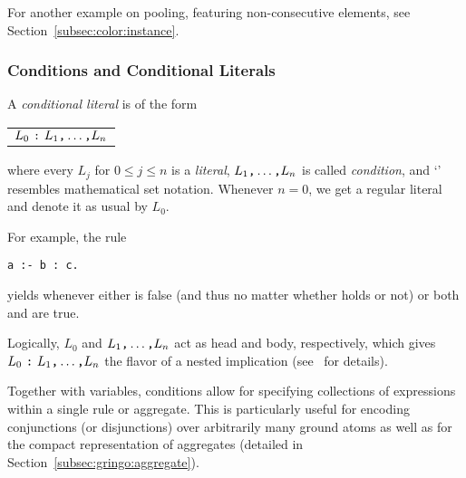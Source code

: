 For another example on pooling, featuring non-consecutive elements, see Section~\ref{subsec:color:instance}.

\subsubsection{Conditions and Conditional Literals}\label{subsec:gringo:condition}
%
%
A \emph{conditional literal} is of the form
\par
\medskip
\begin{tabular}{l}
$L_0~\texttt{:}~L_1\text{\texttt{,}}\dots\text{\texttt{,}}L_n$ %
\end{tabular}
\par
\medskip
\noindent
%
where every $L_j$ for $0\leq j\leq n$ is a \emph{literal},
$L_1\text{\texttt{,}}\dots\text{\texttt{,}}L_n$ is called \textit{condition},
and `\code{:}' resembles mathematical set notation.
Whenever $n=0$, we get a regular literal and denote it as usual by $L_0$.

For example, the rule
\begin{lstlisting}[numbers=none]
a :- b : c.
\end{lstlisting}
yields  whenever either  is false (and thus no matter whether  holds or not) or both  and  are true.

\begin{note}
Logically, $L_0$ and $L_1\text{\texttt{,}}\dots\text{\texttt{,}}L_n$ act as
head and body, respectively,
which gives $L_0~\texttt{:}~L_1\text{\texttt{,}}\dots\text{\texttt{,}}L_n$ 
the flavor of a nested implication
(see~\cite{haliya14a} for details).
\end{note}

Together with variables,
conditions allow for specifying collections of expressions within a single rule or aggregate.
This is particularly useful for encoding conjunctions (or disjunctions) over
arbitrarily many ground atoms as well as for the compact representation of aggregates
(detailed in Section~\ref{subsec:gringo:aggregate}).

